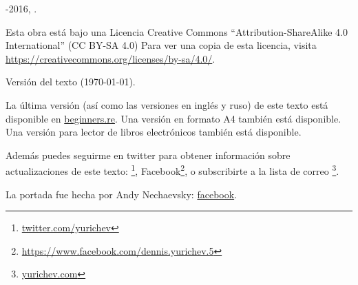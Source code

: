 ﻿\begin{titlepage}


\end{titlepage}

\newpage

\begin{center}
\vspace*{\fill}
{\LARGE \TITLE}

\vspace*{\fill}

{\large \AUTHOR}

{\large \TT{<\EMAIL>}}
\vspace*{\fill}
\vfill

\ccbysa

-2016, \AUTHOR. 

Esta obra est\'a bajo una Licencia Creative Commons ``Attribution-ShareAlike 4.0 International'' (CC BY-SA 4.0)
Para ver una copia de esta licencia, visita \url{https://creativecommons.org/licenses/by-sa/4.0/}.

Versi\'on del texto ({\large \today}).

La \'ultima versi\'on (as\'i como las versiones en ingl\'es y ruso) de este texto est\'a disponible en
\href{http://go.yurichev.com/17009}{beginners.re}.
\ifdefined\ebook
Una versi\'on en formato A4 tambi\'en est\'a disponible.
\else
Una versi\'on para lector de libros electr\'onicos tambi\'en est\'a disponible.
\fi

Adem\'as puedes seguirme en twitter para obtener informaci\'on sobre actualizaciones de este texto:
\footnote{\href{http://go.yurichev.com/17021}{twitter.com/yurichev}},
\ESph{} Facebook\footnote{\url{https://www.facebook.com/dennis.yurichev.5}},
o subscribirte a la lista de correo
\footnote{\href{http://go.yurichev.com/17020}{yurichev.com}}.

La portada fue hecha por Andy Nechaevsky: \href{http://go.yurichev.com/17023}{facebook}.

\end{center}
